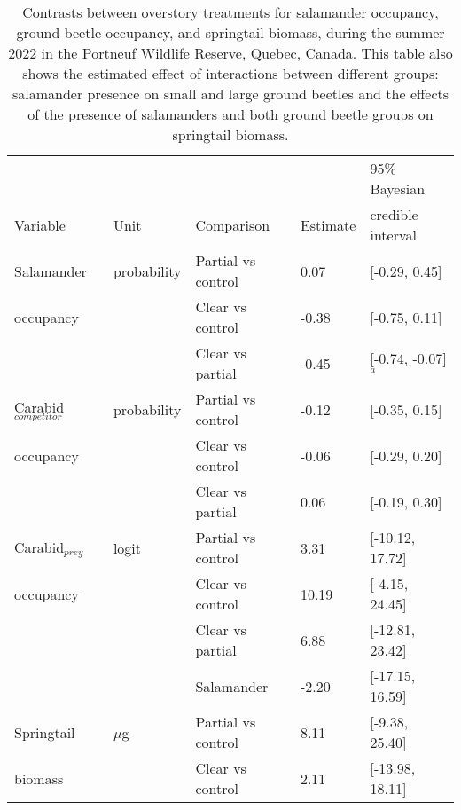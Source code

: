 \begin{table}[ht]
  \centering
  \caption[Contrasts between overstory treatments for salamander occupancy, ground beetle occupancy, and springtail biomass.]
  {Contrasts between overstory treatments for salamander occupancy, ground beetle occupancy, and springtail biomass, during the summer 2022 in the Portneuf Wildlife Reserve, Quebec, Canada. 
  This table also shows the estimated effect of interactions between different groups: salamander presence on small and large ground beetles and the effects of the presence of salamanders and both ground beetle groups on springtail biomass.}
  \label{tab:overstorysp}
  \begin{tabular}{lllll} 
      \hline
      &&&&95\% Bayesian \\
      Variable&Unit& Comparison & Estimate &  credible interval \\ [0.5ex] 
      \hline     
      Salamander           &probability& Partial vs control & \hspace{1mm}0.07 & [-0.29, 0.45] \\ 
      occupancy       && Clear vs control  & -0.38 & [-0.75, 0.11] \\ 
                          && Clear vs partial  & -0.45 & [-0.74, -0.07]$^{a}$ \\       
      Carabid$_{competitor}$ &probability& Partial vs control & -0.12 & [-0.35, 0.15] \\
      occupancy       && Clear vs control  & -0.06 & [-0.29, 0.20] \\ 
                          && Clear vs partial  & \hspace{1mm}0.06 & [-0.19, 0.30] \\ 
      Carabid$_{prey}$    &logit& Partial vs control & \hspace{1mm}3.31 & [-10.12, 17.72] \\
      occupancy             && Clear vs control  & \hspace{1mm}10.19 & [-4.15, 24.45] \\ 
                          && Clear vs partial  & \hspace{1mm}6.88 & [-12.81, 23.42] \\  
                          && Salamander        & -2.20 & [-17.15, 16.59] \\  
      Springtail          &$\mu$g& Partial vs control & \hspace{1mm}8.11 & [-9.38, 25.40] \\
      biomass             && Clear vs control  & \hspace{1mm}2.11 & [-13.98, 18.11] \\ 

\end{tabular}
\end{table}
